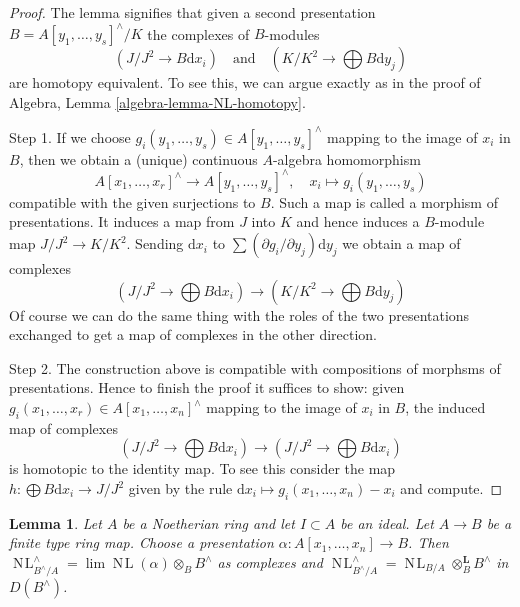 \documentclass{stacks-project}
\theoremstyle{plain}
\newtheorem{lemma}[subsection]{Lemma}
\theoremstyle{definition}
\theoremstyle{remark}
\numberwithin{equation}{subsection}
\def\lim{\mathop{\mathrm{lim}}\nolimits}
\def\NL{\mathop{N\!L}\nolimits}
\begin{document}
\begin{proof}
The lemma signifies that given a second presentation
$B = A[y_1, \ldots, y_s]^\wedge / K$ the complexes of $B$-modules
$$
(J/J^2 \to B\text{d}x_i)
\quad\text{and}\quad
(K/K^2 \to \bigoplus B\text{d}y_j)
$$
are homotopy equivalent. To see this, we can argue exactly as in
the proof of Algebra, Lemma \ref{algebra-lemma-NL-homotopy}.

\medskip\noindent
Step 1. If we choose $g_i(y_1, \ldots, y_s) \in A[y_1, \ldots, y_s]^\wedge$
mapping to the image of $x_i$ in $B$, then we obtain a (unique) continuous
$A$-algebra homomorphism
$$
A[x_1, \ldots, x_r]^\wedge \to A[y_1, \ldots, y_s]^\wedge,\quad
x_i \mapsto g_i(y_1, \ldots, y_s)
$$
compatible with the given surjections to $B$. Such a map is called
a morphism of presentations. It induces a map from $J$ into $K$
and hence induces a $B$-module map $J/J^2 \to K/K^2$. Sending
$\text{d}x_i$ to $\sum (\partial g_i/\partial y_j)\text{d}y_j$
we obtain a map of complexes
$$
(J/J^2 \to \bigoplus B\text{d}x_i)
\longrightarrow
(K/K^2 \to \bigoplus B\text{d}y_j)
$$
Of course we can do the same thing with the roles of the two presentations
exchanged to get a map of complexes in the other direction.

\medskip\noindent
Step 2. The construction above is compatible with compositions of morphsms
of presentations. Hence to finish the proof it suffices to show: given
$g_i(x_1, \ldots, x_r) \in A[x_1, \ldots, x_n]^\wedge$
mapping to the image of $x_i$ in $B$, the induced map of complexes
$$
(J/J^2 \to \bigoplus B\text{d}x_i)
\longrightarrow
(J/J^2 \to \bigoplus B\text{d}x_i)
$$
is homotopic to the identity map. To see this consider the map
$h : \bigoplus B \text{d}x_i \to J/J^2$ given by the rule
$\text{d}x_i \mapsto g_i(x_1, \ldots, x_n) - x_i$ and compute.
\end{proof}

\begin{lemma}
\label{lemma-NL-is-completion}
Let $A$ be a Noetherian ring and let $I \subset A$ be an ideal.
Let $A \to B$ be a finite type ring map. Choose a presentation
$\alpha : A[x_1, \ldots, x_n] \to B$. Then
$\NL_{B^\wedge/A}^\wedge = \lim \NL(\alpha) \otimes_B B^\wedge$
as complexes and
$\NL_{B^\wedge/A}^\wedge = \NL_{B/A} \otimes_B^\mathbf{L} B^\wedge$
in $D(B^\wedge)$.
\end{lemma}
\end{document}
